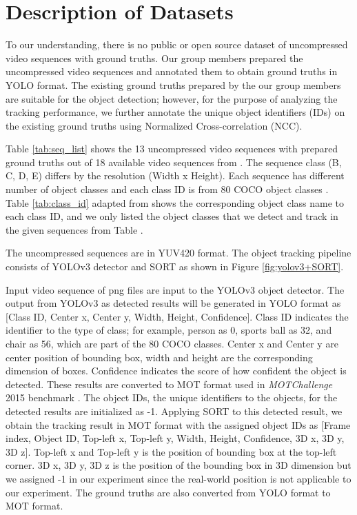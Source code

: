\section{Description of Datasets}
\label{sec:methods/section_a}

To our understanding, there is no public or open source dataset of uncompressed video sequences with ground truths. Our group members prepared the uncompressed video sequences and annotated them to obtain ground truths in YOLO format. The existing ground truths prepared by the our group members are suitable for the object detection; however, for the purpose of analyzing the tracking performance, we further annotate the unique object identifiers (IDs) on the existing ground truths using Normalized Cross-correlation (NCC).

Table \ref{tab:seq_list} shows the 13 uncompressed video sequences with prepared ground truths out of 18 available video sequences from \cite{choi_vcm_2020}. The sequence class (B, C, D, E) differs by the resolution (Width x Height). Each sequence has different number of object classes and each class ID is from 80 COCO object classes \cite{lin_microsoft_2014}. Table \ref{tab:class_id} adapted from \cite{choi_vcm_2020} shows the corresponding object class name to each class ID, and we only listed the object classes that we detect and track in the given sequences from Table \cite{tab:seq_list}.

The uncompressed sequences are in YUV420 format. The object tracking pipeline consists of YOLOv3 detector and SORT as shown in Figure \ref{fig:yolov3+SORT}. 

Input video sequence of png files are input to the YOLOv3 object detector. The output from YOLOv3 as detected results will be generated in YOLO format as [Class ID, Center x, Center y, Width, Height, Confidence]. Class ID indicates the identifier to the type of class; for example, person as 0, sports ball as 32, and chair as 56, which are part of the 80 COCO classes. Center x and Center y are center position of bounding box, width and height are the corresponding dimension of boxes. Confidence indicates the score of how confident the object is detected. These results are converted to MOT format used in \textit{MOTChallenge} 2015 benchmark \cite{leal-taixe_motchallenge_2015}. The object IDs, the unique identifiers to the objects, for the detected results are initialized as -1. Applying SORT to this detected result, we obtain the tracking result in MOT format with the assigned object IDs as [Frame index, Object ID, Top-left x, Top-left y, Width, Height, Confidence, 3D x, 3D y, 3D z]. Top-left x and Top-left y is the position of bounding box at the top-left corner. 3D x, 3D y, 3D z is the position of the bounding box in 3D dimension but we assigned -1 in our experiment since the real-world position is not applicable to our experiment. The ground truths are also converted from YOLO format to MOT format.

